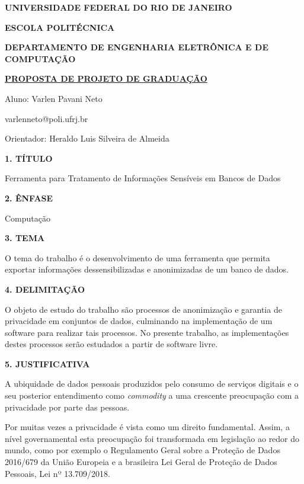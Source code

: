 \documentclass[a4paper,12pt,oneside,openany]{report}
\begin{document}
\begin{center}
\textbf{UNIVERSIDADE FEDERAL DO RIO DE JANEIRO}
\vspace{-0.2cm}

\textbf{ESCOLA POLITÉCNICA}
\vspace{-0.2cm}

\textbf{DEPARTAMENTO DE ENGENHARIA ELETRÔNICA E DE COMPUTAÇÃO}
\vspace{0.8cm}

\underline{\textbf{PROPOSTA DE PROJETO DE GRADUAÇÃO}}

Aluno: Varlen Pavani Neto
\vspace{-0.2cm}

varlenneto@poli.ufrj.br

Orientador: Heraldo Luis Silveira de Almeida
\end{center}

\textbf{1. TÍTULO}

	Ferramenta para Tratamento de Informações Sensíveis em Bancos de Dados

\vspace{0.4cm}
\textbf{2. ÊNFASE}

Computação

\vspace{0.4cm}
\textbf{3. TEMA}

O tema do trabalho é o desenvolvimento de uma ferramenta que permita exportar informações dessensibilizadas e anonimizadas de um banco de dados.

\vspace{0.4cm}
\textbf{4. DELIMITAÇÃO}

O objeto de estudo do trabalho são processos de anonimização e garantia de privacidade em conjuntos de dados,
culminando na implementação de um software para realizar tais processos. No presente trabalho, as implementações destes processos serão estudados a partir de software livre.

\vspace{0.4cm}
\textbf{5. JUSTIFICATIVA}

A ubiquidade de dados pessoais produzidos pelo consumo de serviços digitais e o seu posterior entendimento como \textit{commodity} \cite{jmeyer} a uma crescente preocupação com a privacidade por parte das pessoas. 

Por muitas vezes a privacidade é vista como um direito fundamental\cite{solove}. Assim, a nível governamental esta preocupação foi transformada em legislação ao redor do mundo, como por exemplo o Regulamento Geral sobre a Proteção de Dados 2016/679 da União Europeia e a brasileira Lei Geral de Proteção de Dados Pessoais, Lei nº 13.709/2018.
\end{document}
